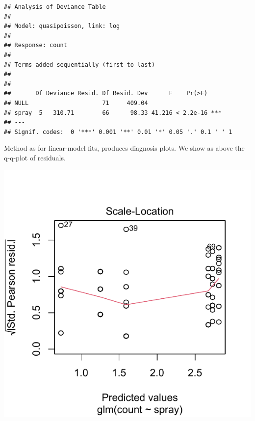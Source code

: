 \documentclass[krantz2]{krantz}\usepackage{knitr}
\begin{document}
\begin{knitrout}\footnotesize
{}\color{fgcolor}\begin{kframe}
\begin{alltt}
  \hlstd{=} \hlstd{)}
\end{alltt}
\begin{verbatim}
## Analysis of Deviance Table
## 
## Model: quasipoisson, link: log
## 
## Response: count
## 
## Terms added sequentially (first to last)
## 
## 
##       Df Deviance Resid. Df Resid. Dev      F    Pr(>F)    
## NULL                     71     409.04                     
## spray  5   310.71        66      98.33 41.216 < 2.2e-16 ***
## ---
## Signif. codes:  0 '***' 0.001 '**' 0.01 '*' 0.05 '.' 0.1 ' ' 1
\end{verbatim}
\end{kframe}
\end{knitrout}

Method  as for linear-model fits, produces diagnosis plots. We show as above the q-q-plot of residuals.

\begin{knitrout}\footnotesize
{}\color{fgcolor}\begin{kframe}
\begin{alltt}
  \hlstd{=} \hlstd{)}
\end{alltt}
\end{kframe}

{\centering \includegraphics[width=.54\textwidth]{figure/pos-model-11-1} 

}


\end{knitrout}
\end{document}
